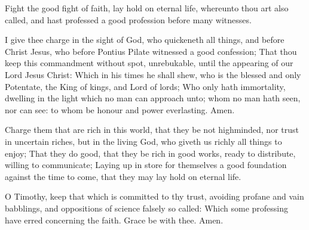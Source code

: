 \verse Fight the good fight of faith, lay hold on eternal life, whereunto thou art also called, and hast professed a good profession before many witnesses.

\verse I give thee charge in the sight of God, who quickeneth all things, and before Christ Jesus, who before Pontius Pilate witnessed a good confession; \verse That thou keep this commandment without spot, unrebukable, until the appearing of our Lord Jesus Christ: \verse Which in his times he shall shew, who is the blessed and only Potentate, the King of kings, and Lord of lords; \verse Who only hath immortality, dwelling in the light which no man can approach unto; whom no man hath seen, nor can see: to whom be honour and power everlasting. Amen.

\verse Charge them that are rich in this world, that they be not highminded, nor trust in uncertain riches, but in the living God, who giveth us richly all things to enjoy; \verse That they do good, that they be rich in good works, ready to distribute, willing to communicate; \verse Laying up in store for themselves a good foundation against the time to come, that they may lay hold on eternal life.

\verse O Timothy, keep that which is committed to thy trust, avoiding profane and vain babblings, and oppositions of science falsely so called: \verse Which some professing have erred concerning the faith.  Grace be with thee. Amen.

